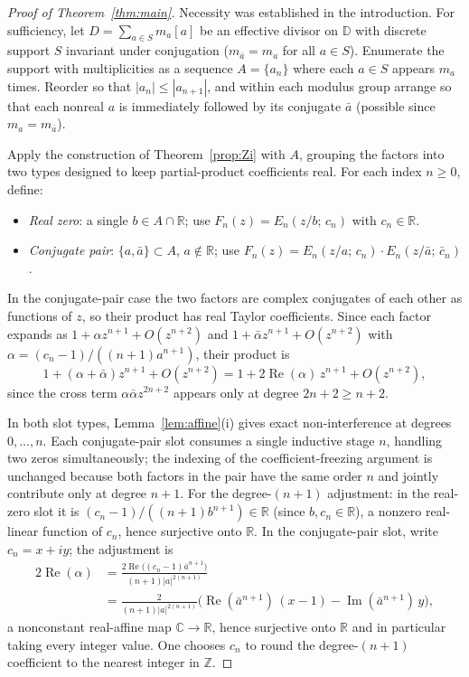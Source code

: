 \documentclass[12pt]{amsart}
\theoremstyle{definition}
\newcommand{\D}{\mathbb{D}}
\newcommand{\Z}{\mathbb{Z}}
\newcommand{\C}{\mathbb{C}}
\newcommand{\R}{\mathbb{R}}
\newcommand{\abs}[1]{\left|#1\right|}
\begin{document}
\begin{proof}[Proof of Theorem~\ref{thm:main}]
Necessity was established in the introduction.  For sufficiency, let
$D = \sum_{a \in S} m_a[a]$ be an effective divisor on $\D$ with
discrete support $S$ invariant under conjugation ($m_{\bar a} = m_a$
for all $a \in S$).  Enumerate the support with multiplicities as a
sequence $A = \{a_n\}$ where each $a \in S$ appears $m_a$ times.
Reorder so that $\abs{a_n} \leq \abs{a_{n+1}}$, and within each
modulus group arrange so that each nonreal $a$ is immediately followed
by its conjugate $\bar a$ (possible since $m_a = m_{\bar a}$).

Apply the construction of Theorem~\ref{prop:Zi} with $A$, grouping the
factors into two types designed to keep partial-product coefficients
real.  For each index $n \geq 0$, define:
\begin{itemize}
  \item \emph{Real zero}: a single $b \in A \cap \R$; use
        $F_n(z) = E_n(z/b;\,c_n)$ with $c_n \in \R$.
  \item \emph{Conjugate pair}: $\{a, \bar{a}\} \subset A$,
        $a \notin \R$; use
        $F_n(z) = E_n(z/a;\,c_n)\cdot E_n(z/\bar{a};\,\bar{c}_n)$.
\end{itemize}
In the conjugate-pair case the two factors are complex conjugates of each
other as functions of $z$, so their product has real Taylor coefficients.
Since each factor expands as $1 + \alpha z^{n+1} + O(z^{n+2})$ and
$1 + \bar\alpha z^{n+1} + O(z^{n+2})$ with
$\alpha = (c_n-1)/((n+1)a^{n+1})$, their product is
\[
  1 + (\alpha + \bar\alpha)z^{n+1} + O(z^{n+2})
  = 1 + 2\operatorname{Re}(\alpha)\,z^{n+1} + O(z^{n+2}),
\]
since the cross term $\alpha\bar\alpha z^{2n+2}$ appears only at degree
$2n+2 \geq n+2$.

In both slot types, Lemma~\ref{lem:affine}(i) gives exact non-interference
at degrees $0,\ldots,n$.  Each conjugate-pair slot consumes a single
inductive stage $n$, handling two zeros simultaneously; the indexing
of the coefficient-freezing argument is unchanged because both factors
in the pair have the same order $n$ and jointly contribute only at
degree $n+1$.  For the degree-$(n+1)$ adjustment: in the real-zero
slot it is $(c_n-1)/((n+1)b^{n+1}) \in \R$ (since $b, c_n \in \R$),
a nonzero real-linear function of $c_n$, hence surjective onto $\R$.
In the conjugate-pair slot, write $c_n = x + iy$; the adjustment is
\begin{align*}
  2\operatorname{Re}(\alpha)
  &= \frac{2\operatorname{Re}\bigl((c_n-1)\bar{a}^{n+1}\bigr)}{(n+1)\abs{a}^{2(n+1)}} \\
  &= \frac{2}{(n+1)\abs{a}^{2(n+1)}}
    \bigl(\operatorname{Re}(\bar{a}^{n+1})\,(x-1)
          - \operatorname{Im}(\bar{a}^{n+1})\,y\bigr),
\end{align*}
a nonconstant real-affine map $\C \to \R$, hence surjective onto $\R$
and in particular taking every integer value.  One chooses $c_n$ to
round the degree-$(n+1)$ coefficient to the nearest integer in $\Z$.


\end{proof}
\end{document}
